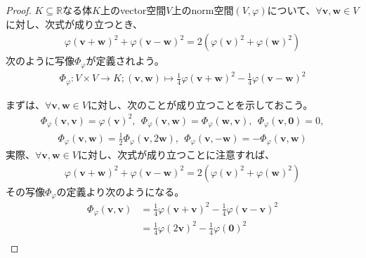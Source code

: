 \documentclass[dvipdfmx]{jsarticle}
\begin{document}
\begin{proof}
$K \subseteq \mathbb{R}$なる体$K$上のvector空間$V$上のnorm空間$(V,\varphi)$について、$\forall\mathbf{v},\mathbf{w} \in V$に対し、次式が成り立つとき、
\begin{align*}
{\varphi\left( \mathbf{v} + \mathbf{w} \right)}^{2} + {\varphi\left( \mathbf{v} - \mathbf{w} \right)}^{2} = 2\left( {\varphi\left( \mathbf{v} \right)}^{2} + {\varphi\left( \mathbf{w} \right)}^{2} \right)
\end{align*}
次のように写像$\varPhi_{\varphi}$が定義されよう。
\begin{align*}
\varPhi_{\varphi}:V \times V \rightarrow K;\left( \mathbf{v},\mathbf{w} \right) \mapsto \frac{1}{4}{\varphi\left( \mathbf{v} + \mathbf{w} \right)}^{2} - \frac{1}{4}{\varphi\left( \mathbf{v} - \mathbf{w} \right)}^{2}
\end{align*}\par
まずは、$\forall\mathbf{v},\mathbf{w} \in V$に対し、次のことが成り立つことを示しておこう。
\begin{align*}
\varPhi_{\varphi}\left( \mathbf{v},\mathbf{v} \right) = {\varphi\left( \mathbf{v} \right)}^{2},\ \ \varPhi_{\varphi}\left( \mathbf{v},\mathbf{w} \right) = \varPhi_{\varphi}\left( \mathbf{w},\mathbf{v} \right),\ \ \varPhi_{\varphi}\left( \mathbf{v},\mathbf{0} \right) = 0,
\end{align*}
\begin{align*}
\varPhi_{\varphi}\left( \mathbf{v},\mathbf{w} \right) = \frac{1}{2}\varPhi_{\varphi}\left( \mathbf{v},2\mathbf{w} \right),\ \ \varPhi_{\varphi}\left( \mathbf{v}, - \mathbf{w} \right) = - \varPhi_{\varphi}\left( \mathbf{v},\mathbf{w} \right)
\end{align*}
実際、$\forall\mathbf{v},\mathbf{w} \in V$に対し、次式が成り立つことに注意すれば、
\begin{align*}
{\varphi\left( \mathbf{v} + \mathbf{w} \right)}^{2} + {\varphi\left( \mathbf{v} - \mathbf{w} \right)}^{2} = 2\left( {\varphi\left( \mathbf{v} \right)}^{2} + {\varphi\left( \mathbf{w} \right)}^{2} \right)
\end{align*}
その写像$\varPhi_{\varphi}$の定義より次のようになる。
\begin{align*}
\varPhi_{\varphi}\left( \mathbf{v},\mathbf{v} \right) &= \frac{1}{4}{\varphi\left( \mathbf{v} + \mathbf{v} \right)}^{2} - \frac{1}{4}{\varphi\left( \mathbf{v} - \mathbf{v} \right)}^{2}\\
&= \frac{1}{4}{\varphi\left( 2\mathbf{v} \right)}^{2} - \frac{1}{4}{\varphi\left( \mathbf{0} \right)}^{2}\\

\end{align*}
\end{proof}
\end{document}
